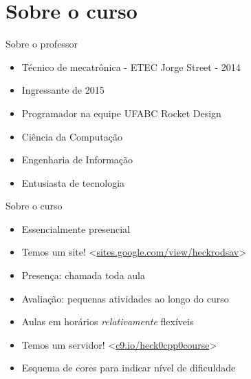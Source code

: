 \documentclass[11pt]{beamer}
\subtitle{Introducto}
\begin{document}
\titlepage

\begin{frame}
	\tableofcontents
\end{frame}

\section{Sobre o curso}
	\begin{frame}{Sobre o professor}
		\begin{itemize}
			\presentationPause\item Técnico de mecatrônica - ETEC Jorge Street - 2014
			\presentationPause\item Ingressante de 2015
			\presentationPause\item Programador na equipe UFABC Rocket Design
			\presentationPause\item Ciência da Computação
			\presentationPause\item Engenharia de Informação
			\presentationPause\item Entusiasta de tecnologia
		\end{itemize}
	\end{frame}	


	\begin{frame}{Sobre o curso}
		\begin{itemize}
			\presentationPause\item Essencialmente presencial
			\presentationPause\item Temos um site! <\href{https://sites.google.com/view/heckrodsav}{sites.google.com/view/heckrodsav}>
			\presentationPause\item Presença: chamada toda aula
			\presentationPause\item Avaliação: pequenas atividades ao longo do curso
			\presentationPause\item Aulas em horários {\itshape relativamente} flexíveis
			\presentationPause\item Temos um servidor! <\href{https://c9.io/heck0cpp0course}{c9.io/heck0cpp0course}>
			\presentationPause\item Esquema de cores para indicar nível de dificuldade
		\end{itemize}
		\begin{center}
			\palette
		\end{center}
	\end{frame}	
\end{document}
